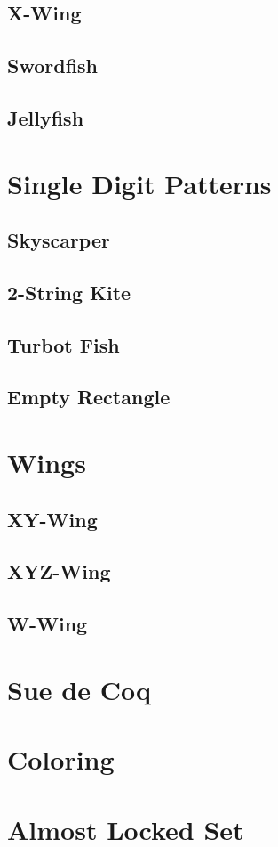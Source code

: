 \documentclass[accentcolor=tud6b,11pt,paper=a4]{tudreport}
\begin{document}
\subsection{X-Wing}
\subsection{Swordfish}
\subsection{Jellyfish}
\section{Single Digit Patterns}
\subsection{Skyscarper}
\subsection{2-String Kite}
\subsection{Turbot Fish}
\subsection{Empty Rectangle}
\section{Wings}
\subsection{XY-Wing}
\subsection{XYZ-Wing}
\subsection{W-Wing}
\section{Sue de Coq}
\section{Coloring}
\section{Almost Locked Set}
\end{document}
